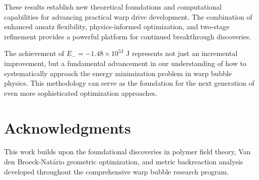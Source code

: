 \documentclass[11pt,a4paper]{article}
\begin{document}
These results establish new theoretical foundations and computational capabilities for advancing practical warp drive development. The combination of enhanced ansatz flexibility, physics-informed optimization, and two-stage refinement provides a powerful platform for continued breakthrough discoveries.

The achievement of $E_- = -1.48 \times 10^{53}$ J represents not just an incremental improvement, but a fundamental advancement in our understanding of how to systematically approach the energy minimization problem in warp bubble physics. This methodology can serve as the foundation for the next generation of even more sophisticated optimization approaches.

\section{Acknowledgments}

This work builds upon the foundational discoveries in polymer field theory, Van den Broeck-Natário geometric optimization, and metric backreaction analysis developed throughout the comprehensive warp bubble research program.
\end{document}
